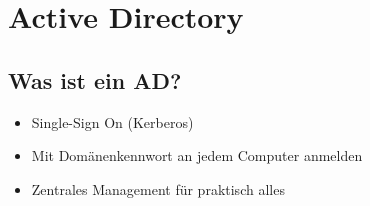 

\section{Active Directory}

\subsection{Was ist ein AD?}
\begin{itemize}
    \item Single-Sign On (Kerberos)
    \item Mit Domänenkennwort an jedem Computer anmelden
    \item Zentrales Management für praktisch alles
\end{itemize}

